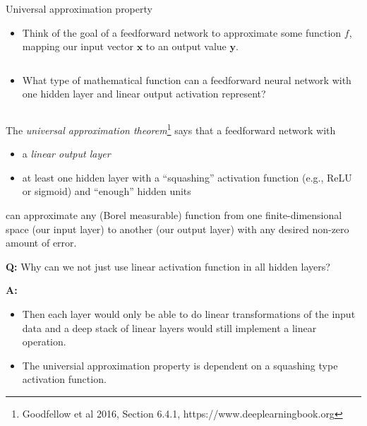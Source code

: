 \documentclass[
  10pt,
  ignorenonframetext,
]{beamer}
\providecommand{\tightlist}{%
  \setlength{\itemsep}{0pt}\setlength{\parskip}{0pt}}
\begin{document}
\begin{frame}
\begin{block}{Universal approximation property}
\protect\hypertarget{universal-approximation-property}{}
\(~\)

\begin{itemize}
\tightlist
\item
  Think of the goal of a feedforward network to approximate some
  function \(f\), mapping our input vector \({\boldsymbol x}\) to an
  output value \({\boldsymbol y}\).
\end{itemize}

\(~\)

\begin{itemize}
\tightlist
\item
  What type of mathematical function can a feedforward neural network
  with one hidden layer and linear output activation represent?
\end{itemize}

\(~\) \pause

The \emph{universal approximation
theorem}\footnote{Goodfellow et al 2016, Section 6.4.1, https://www.deeplearningbook.org}
says that a feedforward network with \vspace{2mm}

\begin{itemize}
\tightlist
\item
  a \emph{linear output layer}
\item
  at least one hidden layer with a ``squashing'' activation function
  (e.g., ReLU or sigmoid) and ``enough'' hidden units
\end{itemize}

\vspace{2mm}

can approximate any (Borel measurable) function from one
finite-dimensional space (our input layer) to another (our output layer)
with any desired non-zero amount of error.
\end{block}
\end{frame}

\begin{frame}
\textbf{Q:} Why can we not just use linear activation function in all
hidden layers?

\pause

\textbf{A:}

\begin{itemize}
\item
  Then each layer would only be able to do linear transformations of the
  input data and a deep stack of linear layers would still implement a
  linear operation.
\item
  The universial approximation property is dependent on a squashing type
  activation function.
\end{itemize}
\end{frame}
\end{document}
